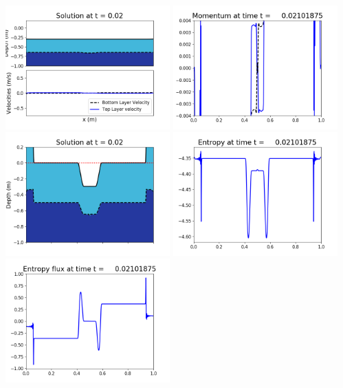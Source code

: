 \documentclass[11pt]{article}
\begin{document}
\includegraphics[width=0.475\textwidth]{frame0049fig1002.png}
\vskip 10pt 
\includegraphics[width=0.475\textwidth]{frame0049fig1003.png}
\includegraphics[width=0.475\textwidth]{frame0049fig1006.png}
\vskip 10pt 
\includegraphics[width=0.475\textwidth]{frame0049fig1007.png}
\includegraphics[width=0.475\textwidth]{frame0049fig1008.png}
\end{document}
